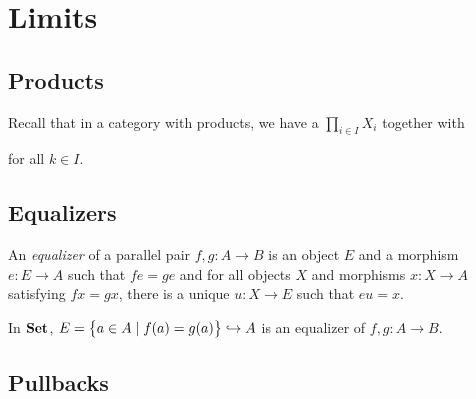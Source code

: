 \chapter{Limits}

\section{Products}

Recall that in a category with products, we have a $\prod_{i \in I} X_i$
together with 
\begin{center}
\end{center}
for all $k \in I$.

\section{Equalizers}

An \emph{equalizer} of a parallel pair $f,g: A\to B$ is an object $E$ and a
morphism $e: E \to A$ such that $fe=ge$ and for all objects $X$ and morphisms
$x: X \to A$ satisfying $fx=gx$, there is a unique $u: X \to E$ such that
$eu = x$.

\begin{center}
\end{center}

\begin{example}
In $\mathbf {Set}$, $E = \big\{  a \in A \mid f(a) = g(a)  \big\}\hookrightarrow A$ is
an equalizer of $f,g:A\to B$. 
\end{example}

\section{Pullbacks}

